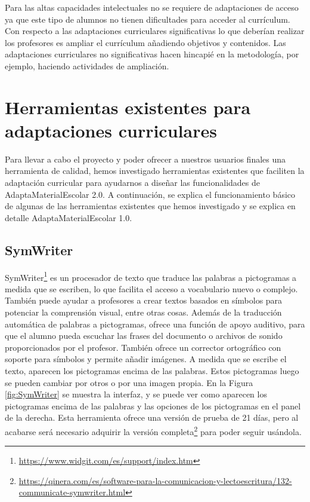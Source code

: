 Para las altas capacidades intelectuales no se requiere de adaptaciones de acceso ya que  este tipo de alumnos no tienen dificultades para acceder al currículum. Con respecto a las adaptaciones curriculares significativas lo que deberían realizar los profesores es ampliar el currículum añadiendo objetivos y contenidos. Las adaptaciones curriculares no significativas hacen hincapié en la metodología, por ejemplo, haciendo actividades de ampliación.

\section{Herramientas existentes para adaptaciones curriculares}
\label{sec:herramientasexistentes}
Para llevar a cabo el proyecto y poder ofrecer a nuestros usuarios finales una herramienta de calidad, hemos investigado herramientas existentes que faciliten la adaptación curricular para ayudarnos a diseñar las funcionalidades de AdaptaMaterialEscolar 2.0. A continuación, se explica el funcionamiento básico de algunas de las herramientas existentes que hemos investigado y se explica en detalle AdaptaMaterialEscolar 1.0.

\subsection{SymWriter}
SymWriter\footnote{\url{https://www.widgit.com/es/support/index.htm}} es un procesador de texto que traduce las palabras a pictogramas a medida que se escriben, lo que facilita el acceso a vocabulario nuevo o complejo. También puede ayudar a profesores a crear textos basados en símbolos para potenciar la comprensión visual, entre otras cosas. Además de la traducción automática de palabras a pictogramas, ofrece una función de apoyo auditivo, para que el alumno pueda escuchar las frases del documento o archivos de sonido proporcionados por el profesor. También ofrece un corrector ortográfico con soporte para símbolos y permite añadir imágenes. A medida que se escribe el texto, aparecen los pictogramas encima de las palabras. Estos pictogramas luego se pueden cambiar por otros o por una imagen propia. En la Figura \ref{fig:SymWriter} se muestra la interfaz, y se puede ver como aparecen los pictogramas encima de las palabras y las opciones de los pictogramas en el panel de la derecha. Esta herramienta ofrece una versión de prueba de 21 días, pero al acabarse será necesario adquirir la versión completa\footnote{\url{https://qinera.com/es/software-para-la-comunicacion-y-lectoescritura/132-communicate-symwriter.html}} para poder seguir usándola.

